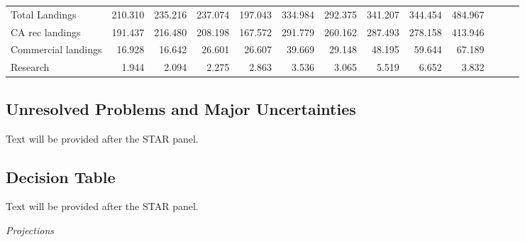 \documentclass[
  english,
  a4paper,
]{article}
\begin{document}
\begin{table}
{\begin{tabular}[t]{lrrrrrrrrrrrr}
\hspace{1em}Total Landings & 210.310 & 235.216 & 237.074 & 197.043 & 334.984 & 292.375 & 341.207 & 344.454 & 484.967 &  &  & \\
\hspace{1em}CA rec landings & 191.437 & 216.480 & 208.198 & 167.572 & 291.779 & 260.162 & 287.493 & 278.158 & 413.946 &  &  & \\
\hspace{1em}Commercial landings & 16.928 & 16.642 & 26.601 & 26.607 & 39.669 & 29.148 & 48.195 & 59.644 & 67.189 &  &  & \\
\hspace{1em}Research & 1.944 & 2.094 & 2.275 & 2.863 & 3.536 & 3.065 & 5.519 & 6.652 & 3.832 &  &  & \\
\bottomrule
\end{tabular}}
\end{table}

\hypertarget{unresolved-problems-and-major-uncertainties}{%
\subsection*{Unresolved Problems and Major Uncertainties}\label{unresolved-problems-and-major-uncertainties}}

Text will be provided after the STAR panel.

\hypertarget{decision-table}{%
\subsection*{Decision Table}\label{decision-table}}

Text will be provided after the STAR panel.

\emph{Projections}
\end{document}
